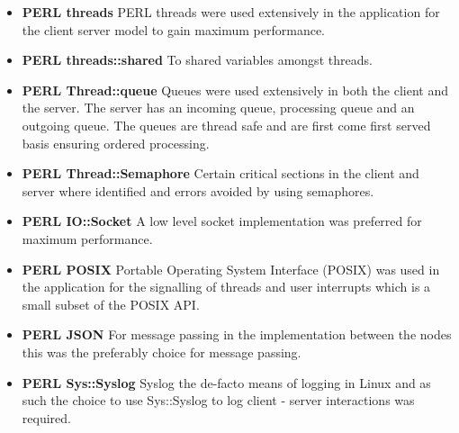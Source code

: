 		\vspace{-5mm}
		\begin{multicols}{2}
		
			\begin{itemize}
			
				\item \textbf{PERL threads}	
					\newline								
					PERL threads were used extensively in the application for the client server model to gain maximum performance.  
				
				\item \textbf{PERL threads::shared}	
					\newline								
					To shared variables amongst threads.
										
				\item \textbf{PERL Thread::queue}	
					\newline								
					Queues were used extensively in both the client and the server.  The server has an incoming queue,
					processing queue and an outgoing queue.  The queues are thread safe and are first come first served basis
					ensuring ordered processing.
							
				\item \textbf{PERL Thread::Semaphore}	
					\newline								
					Certain critical sections in the client and server where identified and errors avoided by using semaphores.
					
		\columnbreak			
					
				\item \textbf{PERL IO::Socket}	
					\newline								
					A low level socket implementation was preferred for maximum performance.				
					
				\item \textbf{PERL POSIX}	
					\newline								
					Portable Operating System Interface (POSIX) was used in the application for the signalling of 
					threads and user interrupts which is a small subset of the POSIX API.  
					
				\item \textbf{PERL JSON}	
					\newline								
					For message passing in the implementation between the nodes this was the preferably choice for message passing.
						
				\item \textbf{PERL Sys::Syslog}		
					\newline							
					Syslog the de-facto means of logging in Linux and as such the choice to use Sys::Syslog 
					to log client - server interactions was required.
					

\end{itemize}
\end{multicols}
